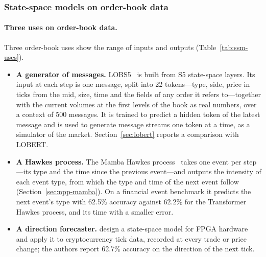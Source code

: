 \subsubsection{State-space models on order-book data}
\label{sec:ssm-lob}

\paragraph{Three uses on order-book data.} Three order-book uses show the range of inputs and outputs (Table~\ref{tab:ssm-uses}).
\begin{itemize}[leftmargin=1.5em,itemsep=1pt]
\item \textbf{A generator of messages.} LOBS5~\citep{nagy2023} is built from S5 state-space layers. Its input at each
  step is one message, split into 22 tokens---type, side, price in ticks from the mid, size, time and the fields of
  any order it refers to---together with the current volumes at the first levels of the book as real numbers, over a
  context of 500 messages. It is trained to predict a hidden token of the latest message and is used to generate
  message streams one token at a time, as a simulator of the market. Section~\ref{sec:lobert} reports a comparison
  with LOBERT.
\item \textbf{A Hawkes process.} The Mamba Hawkes process~\citep{gao2024mhp} takes one event per step---its type and the
  time since the previous event---and outputs the intensity of each event type, from which the type and time of the next
  event follow (Section~\ref{sec:npp-mamba}). On a financial event benchmark it predicts the next event's type with
  62.5\% accuracy against 62.2\% for the Transformer Hawkes process, and its time with a smaller error.
\item \textbf{A direction forecaster.} \citet{popov2026ssm} design a state-space model for FPGA hardware and apply it to
  cryptocurrency tick data, recorded at every trade or price change; the authors report 62.7\% accuracy on the
  direction of the next tick.
\end{itemize}

